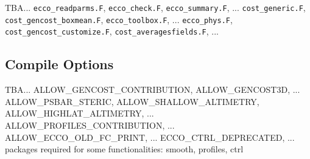 TBA... 
\bigskip
\texttt{ecco\_readparms.F}, \texttt{ecco\_check.F}, \texttt{ecco\_summary.F}, ...
\texttt{cost\_generic.F}, \texttt{cost\_gencost\_boxmean.F}, \texttt{ecco\_toolbox.F}, ... 
\texttt{ecco\_phys.F}, \texttt{cost\_gencost\_customize.F}, \texttt{cost\_averagesfields.F}, ...

\subsection{Compile Options}

TBA... 
\bigskip
ALLOW\_GENCOST\_CONTRIBUTION, ALLOW\_GENCOST3D, ... 
ALLOW\_PSBAR\_STERIC, ALLOW\_SHALLOW\_ALTIMETRY, ALLOW\_HIGHLAT\_ALTIMETRY, ...
ALLOW\_PROFILES\_CONTRIBUTION, ... 
ALLOW\_ECCO\_OLD\_FC\_PRINT, ...
ECCO\_CTRL\_DEPRECATED, ...
\bigskip
packages required for some functionalities: smooth, profiles, ctrl

